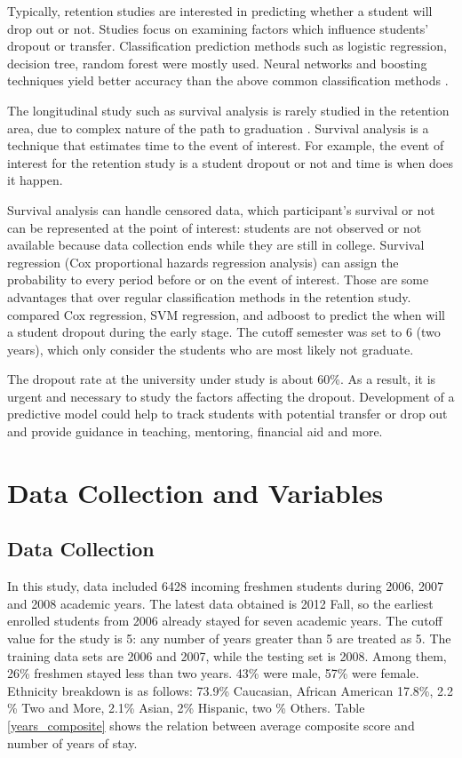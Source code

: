 \documentclass[12pt,english]{report}
\begin{document}
Typically, retention studies are interested in predicting whether a student
will drop out
or not. Studies focus on examining factors which influence students' dropout or
transfer.
Classification prediction methods such as logistic regression, decision tree,
random forest
were mostly
used\citep{dekker2009,AdamGaither2005,quadri2010drop,yu2010data,Herzog2006}.
Neural networks and boosting techniques yield better accuracy than the above
common 
classification methods \citep{Lin2009,zhang2010using, Herzog2006}.

The longitudinal study such as survival analysis is rarely studied in the
retention area,
due to complex nature of the path to graduation \citep{Murtaugh1999,
Ishitani2003, zwick2005}.
Survival analysis is a technique that estimates time to the event of interest.
For example,
the event of interest for the retention study is a student dropout or not and
time is when 
does it happen.


Survival analysis can handle censored data, which participant's survival or not
can be 
represented at the point of interest: students are not observed or not
available because 
data collection ends while they are still in college.
Survival regression (Cox proportional hazards regression analysis) can assign
the probability
to every period before or on the event of interest.
Those are some advantages that over regular classification methods in the
retention study. 
\citet{Ameri2016} compared Cox regression, SVM regression, and adboost to
predict the when 
will a student dropout during the early stage. The cutoff semester was set to 6
(two years),
which only consider the students who are most likely not graduate.

The dropout rate at the university under study is about 60\%. As a result, it
is urgent and 
necessary to study the factors affecting the dropout.  Development of a
predictive model 
could help to track students with potential transfer or drop out and provide
guidance in
teaching, mentoring, financial aid and more.


\section{Data Collection and Variables}

\subsection{Data Collection}

In this study, data included 6428 incoming freshmen students during 2006, 2007
and 2008 academic years. The latest data obtained is 2012 Fall, so the earliest
enrolled students from 2006 already stayed for seven academic years. The cutoff
value for the study is 5: any number of years greater than 5 are treated as 5.
The training data sets are 2006 and 2007, while the testing set is 2008.
Among them, 26\% freshmen stayed less than two years. 43\% were male, 57\% were
female. Ethnicity breakdown is as follows: 73.9\% Caucasian, African American
17.8\%, 2.2 \% Two and More, 2.1\% Asian, 2\% Hispanic, two \% Others. Table 
\ref{years_composite} shows the relation between average composite score and
number of years of stay.
\end{document}
